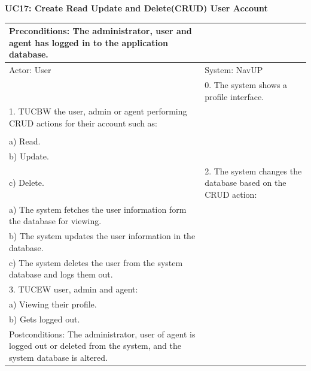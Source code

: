 \documentclass{article}
\begin{document}
	
        		\centering
					\textbf{UC17: Create Read Update and Delete(CRUD) User Account}\\
       		 \small
       		 \begin{tabular}{|p{8cm}|p{8cm}|}
       		 \hline
       		 Preconditions: The administrator, user and agent has logged in to the application database.& \\
       		 \hline
       		 Actor: User & System: NavUP \\
        		\hline
       		 &0.	The system shows a profile interface.\\
       		 \hline
       		1.	TUCBW the user, admin or agent performing CRUD actions for their account such as:\\

\\a)	Read.
\\b)	Update.
\\c)	Delete.
 & 2.	The system changes the database based on the CRUD action:

\\a)	The system fetches the user information form the database for viewing.
\\b)	The system updates the user information in the database.
\\c)	The system deletes the user from the system database and logs them out.

\\
        		\hline
       		3.	TUCEW user, admin and agent:

\\a)	Viewing their profile.
\\b)	Gets logged out.
&\\
       		 \hline
        		Postconditions: The administrator, user of agent is logged out or deleted from the system, and the system database is altered. & \\
        		\hline
        \end{tabular} 
\end{document}
